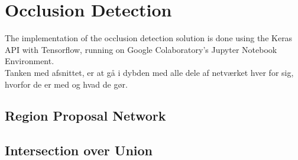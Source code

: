 \section{Occlusion Detection}
The implementation of the occlusion detection solution is done using the Keras API with Tensorflow, running on Google Colaboratory's Jupyter Notebook Environment.\\

Tanken med afsnittet, er at gå i dybden med alle dele af netværket hver for sig, hvorfor de er med og hvad de gør.

\subsection{Region Proposal Network}

\subsection{Intersection over Union}
